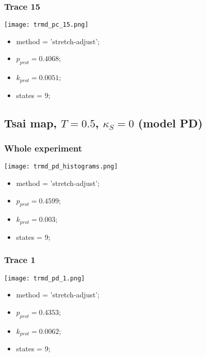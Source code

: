 \subsubsection{Trace 15}
\begin{minipage}[c]{0.7\textwidth}
	\texttt{[image: trmd\_pc\_15.png]}
\end{minipage}
\hfill
\begin{minipage}[c]{0.45\textwidth}
	\begin{itemize}
		\item method = 'stretch-adjust';
		\item $p_{prot}=0.4068$;
		\item $k_{prot}=0.0051$;
		\item states = 9;
	\end{itemize}
\end{minipage}


\subsection{Tsai map, $T=0.5$, $\kappa_S=0$ (model PD)}
\subsubsection{Whole experiment}
\begin{minipage}[c]{0.7\textwidth}
    \texttt{[image: trmd\_pd\_histograms.png]}
\end{minipage}
\hfill
\begin{minipage}[c]{0.45\textwidth}
    \begin{itemize}
        \item method = 'stretch-adjust';
        \item $p_{prot}=0.4599$;
        \item $k_{prot}=0.003$;
        \item states = 9;
    \end{itemize}
\end{minipage}

\subsubsection{Trace 1}
\begin{minipage}[c]{0.7\textwidth}
	\texttt{[image: trmd\_pd\_1.png]}
\end{minipage}
\hfill
\begin{minipage}[c]{0.45\textwidth}
	\begin{itemize}
		\item method = 'stretch-adjust';
		\item $p_{prot}=0.4353$;
		\item $k_{prot}=0.0062$;
		\item states = 9;
	\end{itemize}
\end{minipage}


